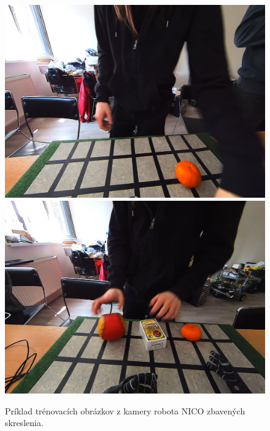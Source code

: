 \begin{figure}[H]
\includegraphics[width=\textwidth]{images/2023-04-17-140334_41_clean.jpg}
\includegraphics[width=\textwidth]{images/2023-04-17-140935_2_clean.jpg}
\centering
\caption{Príklad trénovacích obrázkov z kamery robota NICO zbavených skreslenia.}
\label{fig:image703}
\end{figure}

